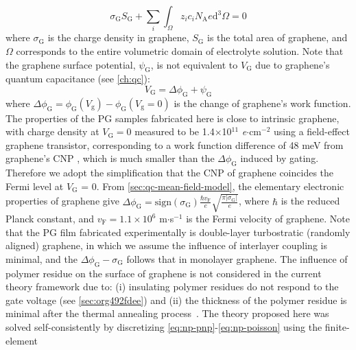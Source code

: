 \begin{equation}
  \label{eq:np-electro-neutral}
  \sigma_{\mathrm{G}} S_{\mathrm{G}} + \sum_{i} \int_{\Omega} z_{i} c_{i} N_{\mathrm{A}} e \mathrm{d}^{3} \Omega= 0
\end{equation}
where $\sigma_{\mathrm{G}}$ is the charge density in graphene,
$S_{\mathrm{G}}$ is the total area of graphene, and $\Omega$
corresponds to the entire volumetric domain of electrolyte
solution. Note that the graphene surface potential,
$\psi_{\mathrm{G}}$, is not equivalent to $V_{\mathrm{G}}$ due to graphene's quantum capacitance (see \autoref{ch:qc}):
\begin{equation}
  \label{eq:np-Vg}
  V_{\mathrm{G}} = \Delta \phi_{\mathrm{G}} + \psi_{\mathrm{G}}
\end{equation}
where
$\Delta \phi_{\mathrm{G}} = \phi_{\mathrm{G}}(V_{\mathrm{g}}) -
\phi_{\mathrm{G}}(V_{\mathrm{g}}=0)$ is the change of graphene’s work
function.
%
The properties of the PG samples fabricated here is close to
intrinsic graphene, with charge density at $V_{\mathrm{G}}=0$ measured
to be 1.4$\times$10$^{11}$ \textit{e}$\cdot$cm$^{-2}$ using a field-effect graphene transistor, corresponding
to a work function difference of 48 meV from graphene's CNP
, which is much smaller than the $\Delta \phi_{\mathrm{G}}$
induced by gating.
%
Therefore we adopt the simplification that the
CNP of graphene coincides the Fermi level at
$V_{\mathrm{G}}$ = 0.
%
From \autoref{sec:qc-mean-field-model}, the elementary electronic
properties of graphene give
\( {\displaystyle \Delta \phi_{\mathrm{G}} =
  \mathrm{sign}(\sigma_{\mathrm{G}}) \frac{\hbar v_{\mathrm{F}}}{e}
  \sqrt{\frac{\pi |\sigma_{\mathrm{G}}|}{e}}}\), where $\hbar$ is the
reduced Planck constant, and $v_{\mathrm{F}}=1.1\times10^{6}$
m$\cdot$s$^{-1}$ is the Fermi velocity of graphene.
%
Note that the PG film fabricated experimentally is double-layer
turbostratic (randomly aligned) graphene, in which we assume the
influence of interlayer coupling is minimal, and the
$\Delta \phi_{\mathrm{G}} - \sigma_{\mathrm{G}}$ follows that in
monolayer graphene.
%
The influence of polymer residue on the surface of graphene is not
considered in the current theory framework due to: (i) insulating
polymer residues do not respond to the gate voltage (see
\autoref{sec:org492fdee}) and (ii) the thickness of the polymer
residue is minimal after the thermal annealing
process~\cite{Choi_2018_wafer_scale_gr}.
%
The theory proposed here was solved self-consistently by discretizing
\autoref{eq:np-pnp}-\autoref{eq:np-poisson} using the finite-element
